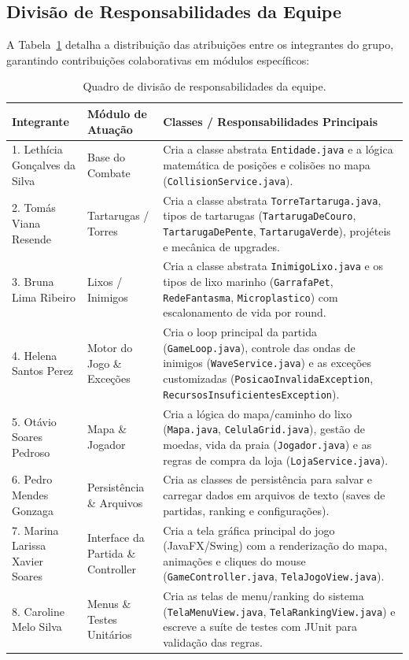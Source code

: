 \documentclass[11pt,a4paper]{article}
\begin{document}
\subsection*{Divisão de Responsabilidades da Equipe}
A Tabela~\ref{tab:responsaveis} detalha a distribuição das atribuições entre os integrantes do grupo, garantindo contribuições colaborativas em módulos específicos:

\begin{table}[h!]
\centering
\small
\begin{tabularx}{\textwidth}{|p{}|p{}|X|}
\hline
\textbf{Integrante} & \textbf{Módulo de Atuação} & \textbf{Classes / Responsabilidades Principais} \\
\hline
1. Lethícia Gonçalves da Silva & Base do Combate & Cria a classe abstrata \texttt{Entidade.java} e a lógica matemática de posições e colisões no mapa (\texttt{CollisionService.java}). \\
\hline
2. Tomás Viana Resende & Tartarugas / Torres & Cria a classe abstrata \texttt{TorreTartaruga.java}, tipos de tartarugas (\texttt{TartarugaDeCouro}, \texttt{TartarugaDePente}, \texttt{TartarugaVerde}), projéteis e mecânica de upgrades. \\
\hline
3. Bruna Lima Ribeiro & Lixos / Inimigos & Cria a classe abstrata \texttt{InimigoLixo.java} e os tipos de lixo marinho (\texttt{GarrafaPet}, \texttt{RedeFantasma}, \texttt{Microplastico}) com escalonamento de vida por round. \\
\hline
4. Helena Santos Perez & Motor do Jogo \& Exceções & Cria o loop principal da partida (\texttt{GameLoop.java}), controle das ondas de inimigos (\texttt{WaveService.java}) e as exceções customizadas (\texttt{PosicaoInvalidaException}, \texttt{RecursosInsuficientesException}). \\
\hline
5. Otávio Soares Pedroso & Mapa \& Jogador & Cria a lógica do mapa/caminho do lixo (\texttt{Mapa.java}, \texttt{CelulaGrid.java}), gestão de moedas, vida da praia (\texttt{Jogador.java}) e as regras de compra da loja (\texttt{LojaService.java}). \\
\hline
6. Pedro Mendes Gonzaga & Persistência \& Arquivos & Cria as classes de persistência para salvar e carregar dados em arquivos de texto (saves de partidas, ranking e configurações). \\
\hline
7. Marina Larissa Xavier Soares & Interface da Partida \& Controller & Cria a tela gráfica principal do jogo (JavaFX/Swing) com a renderização do mapa, animações e cliques do mouse (\texttt{GameController.java}, \texttt{TelaJogoView.java}). \\
\hline
8. Caroline Melo Silva & Menus \& Testes Unitários & Cria as telas de menu/ranking do sistema (\texttt{TelaMenuView.java}, \texttt{TelaRankingView.java}) e escreve a suíte de testes com JUnit para validação das regras. \\
\hline
\end{tabularx}
\caption{Quadro de divisão de responsabilidades da equipe.}
\label{tab:responsaveis}
\end{table}
\end{document}
